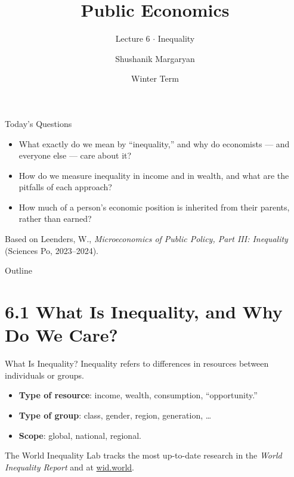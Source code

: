 \documentclass[11pt,aspectratio=169]{beamer}
\title{Public Economics}
\subtitle{Lecture 6 \(\cdot\) Inequality}
\author{Shushanik Margaryan}
\institute{WU Vienna University of Economics and Business}
\date{Winter Term}
\begin{document}
\begin{frame}
  \titlepage
\end{frame}

\begin{frame}{Today's Questions}
  \begin{itemize}
    \item What exactly do we mean by ``inequality,'' and why do economists --- and everyone else --- care about it?
    \item How do we measure inequality in income and in wealth, and what are the pitfalls of each approach?
    \item How much of a person's economic position is inherited from their parents, rather than earned?
  \end{itemize}
  \vspace{1em}
  \begin{block}{Based on}
    Leenders, W., \emph{Microeconomics of Public Policy, Part III: Inequality} (Sciences Po, 2023--2024).
  \end{block}
\end{frame}

\begin{frame}{Outline}
  \tableofcontents
\end{frame}

\section{6.1 What Is Inequality, and Why Do We Care?}

\begin{frame}{What Is Inequality?}
  \small
  Inequality refers to differences in resources between individuals or groups.
  \begin{itemize}
    \item \textbf{Type of resource}: income, wealth, consumption, ``opportunity.''
    \item \textbf{Type of group}: class, gender, region, generation, \ldots
    \item \textbf{Scope}: global, national, regional.
  \end{itemize}
  \vspace{0.3em}
  The World Inequality Lab tracks the most up-to-date research in the \emph{World Inequality Report} and at \href{https://wid.world}{wid.world}.
\end{frame}
\end{document}
